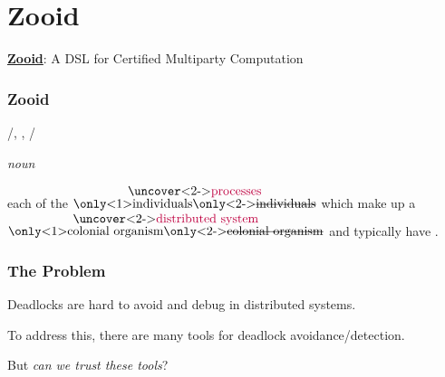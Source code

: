 \section{Zooid}

\begin{frame}
  \vfill
  \begin{sticky}
  {\large
    \textbf{\underline{Zooid}}:
    A
    DSL
    for
    Certified
    Multiparty
    Computation\par
  }
  \end{sticky}
\end{frame}

\begin{frame}
  \frametitle{Zooid}
  {\color{gray}%
    /\phoneticZooidA, \phoneticZooidB, \phoneticZooidC\hspace{-.2cm}/}
  \vspace{.4cm}

  \emph{noun} %
  \vspace{.4cm}

  each of the
  $\stackrel{\text{\normalsize%
      \uncover<2->{\color{purple}processes}}
  }{\text{%
      \only<1>{individuals}\only<2->{\sout{individuals}}}
  }$
  which make up a
  $\stackrel{\text{\normalsize%
      \uncover<2->{\color{purple}distributed system}}
  }{\text{%
      \only<1>{colonial organism}\only<2->{\sout{colonial organism}}}
  }$
  and typically have
  .
\end{frame}

\begin{frame}
  \frametitle{The Problem}

  Deadlocks are hard to avoid and debug in distributed systems.
  \vspace{.5cm}

  To address this, there are many tools for deadlock avoidance/detection.
  \vspace{1cm}

  But \emph{can we trust these tools}?
\end{frame}

